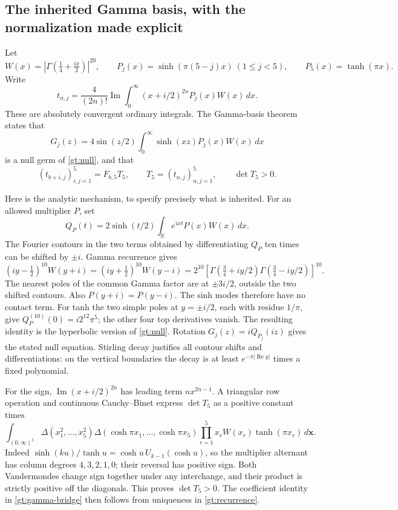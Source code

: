 \documentclass[11pt,a4paper]{article}
\theoremstyle{definition}
\theoremstyle{remark}
\numberwithin{equation}{section}
\begin{document}
\subsection{The inherited Gamma basis, with the normalization made explicit}

Let
\[
 W(x)=\left|\Gamma\!\left(\tfrac14+\tfrac{ix}{2}\right)\right|^{20},
 \qquad
 P_j(x)=\sinh(\pi(5-j)x)\ (1\le j<5),\qquad
 P_5(x)=\tanh(\pi x).
\]
Write
\begin{equation}\label{gt:t}
 t_{n,j}=\frac4{(2n)!}\operatorname{Im}
                  \int_0^\infty(x+i/2)^{2n}P_j(x)W(x)\,dx.
\end{equation}
These are absolutely convergent ordinary integrals. The Gamma-basis
theorem \cite{OrderedBoundary} states that
\[
 G_j(z)=4\sin(z/2)\int_0^\infty\sinh(xz)P_j(x)W(x)\,dx
\]
is a null germ of \eqref{gt:null}, and that
\begin{equation}\label{gt:gamma-bridge}
 (t_{b+i,j})_{i,j=1}^{5}=F_{b,5}T_5,
 \qquad T_5=(t_{n,j})_{n,j=1}^{5},\qquad \det T_5>0.
\end{equation}

Here is the analytic mechanism, to specify precisely what is inherited.
For an allowed multiplier $P$, set
\[
 Q_P(t)=2\sinh(t/2)\int_{\mathbb R}e^{ixt}P(x)W(x)\,dx.
\]
The Fourier contours in the two terms obtained by differentiating
$Q_P$ ten times can be shifted by $\pm i$. Gamma recurrence gives
\[
 (iy-\tfrac12)^{10}W(y+i)
 =(iy+\tfrac12)^{10}W(y-i)
 =2^{10}\left[
    \Gamma(\tfrac34+iy/2)\Gamma(\tfrac34-iy/2)\right]^{10}.
\]
The nearest poles of the common Gamma factor are at $\pm3i/2$,
outside the two shifted contours. Also $P(y+i)=P(y-i)$.
The sinh modes therefore have no contact term. For tanh the two
simple poles at $y=\pm i/2$, each with residue $1/\pi$, give
$Q_P^{(10)}(0)=i2^{12}\pi^5$; the other four top derivatives vanish.
The resulting identity is the hyperbolic version of
\eqref{gt:null}. Rotation $G_j(z)=iQ_{P_j}(iz)$ gives the stated
null equation. Stirling decay justifies all contour shifts and
differentiations: on the vertical boundaries the decay is at least
$e^{-\pi|\operatorname{Re}y|}$ times a fixed polynomial.

For the sign, $\operatorname{Im}(x+i/2)^{2n}$ has leading term
$nx^{2n-1}$. A triangular row operation and continuous Cauchy--Binet
express $\det T_5$ as a positive constant times
\[
 \int_{(0,\infty)^5}
 \Delta(x_1^2,\ldots,x_5^2)
 \Delta(\cosh\pi x_1,\ldots,\cosh\pi x_5)
 \prod_{r=1}^{5}x_rW(x_r)\tanh(\pi x_r)\,d\mathbf x.
\]
Indeed $\sinh(ku)/\tanh u=\cosh u\,U_{k-1}(\cosh u)$,
so the multiplier alternant has column degrees $4,3,2,1,0$;
their reversal has positive sign. Both Vandermondes change sign
together under any interchange, and their product is strictly
positive off the diagonals. This proves $\det T_5>0$.
The coefficient identity in \eqref{gt:gamma-bridge} then follows
from uniqueness in \eqref{gt:recurrence}.
\end{document}
